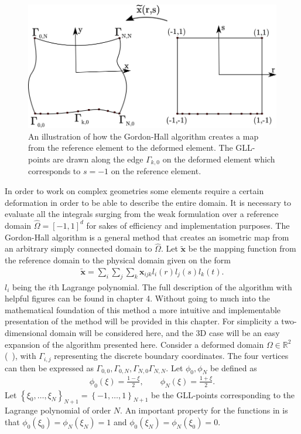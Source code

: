 %
\begin{figure}[h]
	\centering
	\includegraphics[width=1.0\textwidth]{Figures/GordonHall5.png}
	\caption{An illustration of how the Gordon-Hall algorithm creates a map from the 
    reference element to the deformed element. The GLL-points are drawn along the edge
    $\Gamma_{k,0}$ on the deformed element which corresponds to $s=-1$ on the reference
    element.}
	\label{fig:GH}
\end{figure}
%

In order to work on complex geometries some elements require a certain deformation in order to be able 
to describe the entire domain. It is necessary to evaluate all the integrals surging from the weak formulation over 
a reference domain $\hat{\Omega} = [-1,1]^d$ for sakes of efficiency and implementation purposes. The Gordon-Hall 
algorithm is a general method that creates an isometric map from an arbitrary simply connected domain to $\hat{\Omega}$.
Let $\mathbf{\tilde{x}}$ be the mapping function from the reference domain to the physical domain given on the form 
%
\begin{align}
    \mathbf{\tilde{x}}= \sum_i \sum_j \sum_k \mathbf{x}_{ijk}l_i(r) l_j(s) l_k(t).
    \label{eq:mapping}
\end{align}
%
$l_i$ being the $i$th Lagrange polynomial.
The full description of the algorithm with helpful figures can be found in \cite{Deville} chapter 4.
Without going to much into the mathematical foundation of this method a more intuitive and implementable
presentation of the method will be provided in this chapter. 
For simplicity a two-dimensional domain will be considered here, and the 3D case will be an easy expansion 
of the algorithm presented here. Consider a deformed domain $\Omega \in \mathbb{R}^2$ (~), with $\Gamma_{i,j}$ representing 
the discrete boundary coordinates. The four vertices can then be expressed as 
$\Gamma_{0,0},\Gamma_{0,N},\Gamma_{N,0}\Gamma_{N,N}$. Let $\phi_0,\phi_N$ be defined as 
%
\begin{align}
    \phi_0(\xi) = \frac{1-\xi}{2}, \qquad
    \phi_N(\xi) = \frac{1+\xi}{2}.
    \label{eq:interpolationoperator}
\end{align}
%
Let $\left\{ \xi_0, \ldots ,\xi_N \right\}_{N+1} = \left\{ -1 ,\ldots ,1 \right\}_{N+1}$
be the GLL-points corresponding to the Lagrange polynomial of order $N$. 
An important property for the functions in  is that
$\phi_0(\xi_0) =\phi_N(\xi_N) = 1$ and $\phi_0(\xi_N) =\phi_N(\xi_0) = 0$.

